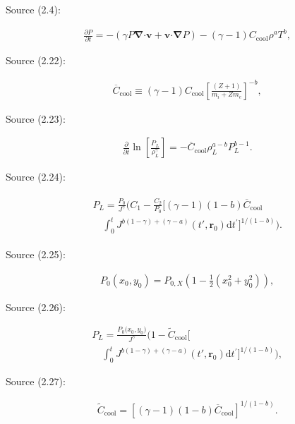 Source (2.4):

\[
\begin{aligned} & \frac {\partial P}{\partial t}=-(\gamma P \boldsymbol{\nabla }\boldsymbol{\cdot }\boldsymbol{v}+\boldsymbol{v}\boldsymbol{\cdot }\boldsymbol{\nabla }P)-(\gamma -1)C_{\text{cool}}\rho ^aT^b , \end{aligned}\tag{S2.4}
\]

Source (2.22):

\[
\begin{aligned} & \overline {C}_{\text{cool}} \equiv (\gamma -1) C_{\text{cool}}\left [\frac {(Z+1)}{m_i+Zm_e}\right ]^{-b}, \end{aligned}\tag{S2.22}
\]

Source (2.23):

\[
\begin{aligned} & \frac {\partial }{\partial t} \ln \left [\frac {P_L}{\rho _L^\gamma }\right ]=-\overline {C}_{\text{cool}} \rho _L^{a-b} P_L^{b-1}. \end{aligned}\tag{S2.23}
\]

Source (2.24):

\[
\begin{gathered}\textstyle \begin{aligned} & P_L=\frac {P_0}{J^\gamma } \bigl (C_1-\frac {C_2}{P_0}\bigl [(\gamma -1)(1-b) \overline {C}_{\text{cool}} \\ &\quad \int _0^t J^{b(1-\gamma )+(\gamma -a)}(t',\boldsymbol{r}_0) \text{d} t^{\prime }\bigr ]^{1 /(1-b)}\bigr ). \end{aligned}\end{gathered}\tag{S2.24}
\]

Source (2.25):

\[
\begin{aligned} & P_0\left (x_0, y_0\right )=P_{0, X}\left (1-\frac {1}{2}\left (x_0^2+y_0^2\right )\right )\!, \end{aligned}\tag{S2.25}
\]

Source (2.26):

\[
\begin{aligned} & P_L=\frac {P_0\bigl (x_0, y_0\bigr )}{J^\gamma }\bigl (1-\widetilde {C}_{\text{cool}}\bigl [ \\ &\quad \int _0^t J^{b(1-\gamma )+(\gamma -a)}(t',\boldsymbol{r}_0) \text{d} t^{\prime }\bigr ]^{1 /(1-b)}\bigr )\!, \end{aligned}\tag{S2.26}
\]

Source (2.27):

\[
\begin{aligned} & \widetilde {C}_{\text{cool}}=[(\gamma -1)(1-b)\overline {C}_{\text{cool}}]^{1/(1-b)}. \end{aligned}\tag{S2.27}
\]

